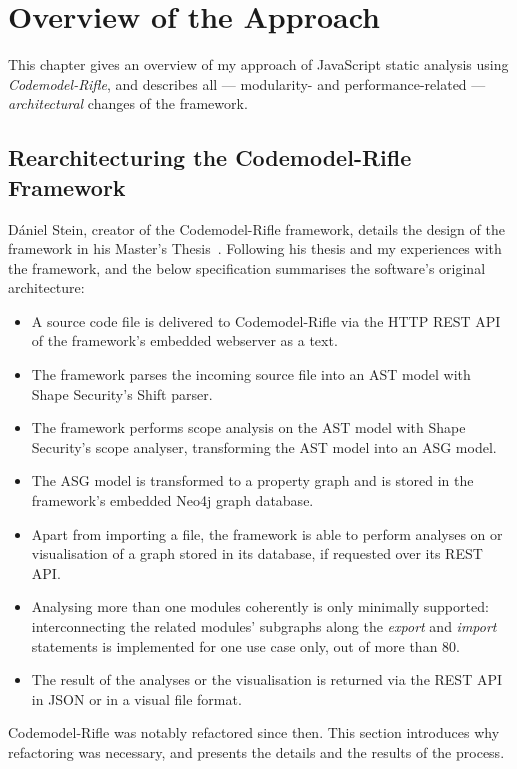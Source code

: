 \chapter{Overview of the Approach}
\label{chapter:overview}

This chapter gives an overview of my approach of JavaScript static analysis using \emph{Codemodel-Rifle}, and describes all — modularity- and performance-related — \emph{architectural} changes of the framework.


\section{Rearchitecturing the Codemodel-Rifle Framework}

Dániel Stein, creator of the Codemodel-Rifle framework, details the design of the framework in his Master's Thesis~\cite{stein-daniel-msc}. Following his thesis and my experiences with the framework,  and the below specification summarises the software's original architecture:

\begin{itemize}
\item A source code file is delivered to Codemodel-Rifle via the HTTP REST API of the framework's embedded webserver as a text.
\item The framework parses the incoming source file into an AST model with Shape Security's Shift parser.
\item The framework performs scope analysis on the AST model with Shape Security's scope analyser, transforming the AST model into an ASG model.
\item The ASG model is transformed to a property graph and is stored in the framework's embedded Neo4j graph database.
\item Apart from importing a file, the framework is able to perform analyses on or visualisation of a graph stored in its database, if requested over its REST API.
\item Analysing more than one \es modules coherently is only minimally supported: interconnecting the related modules' subgraphs along the \emph{export} and \emph{import} \es statements is implemented for one use case only, out of more than 80.
\item The result of the analyses or the visualisation is returned via the REST API in JSON or in a visual file format.
\end{itemize}

Codemodel-Rifle was notably refactored since then. This section introduces why refactoring was necessary, and presents the details and the results of the process.

